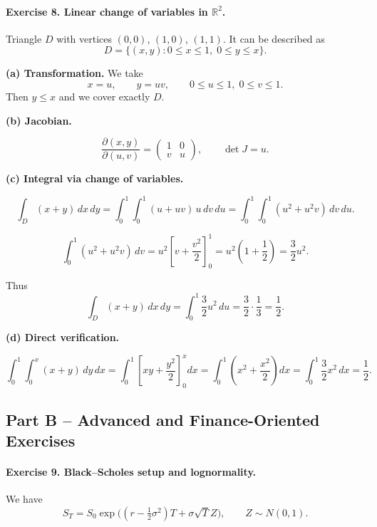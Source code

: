 \documentclass[11pt]{article}
\begin{document}
\bigskip

\paragraph{Exercise 8. Linear change of variables in \(\mathbb{R}^2\).}

Triangle \(D\) with vertices \((0,0)\), \((1,0)\), \((1,1)\).  
It can be described as
\[
D = \{(x,y): 0\le x\le1,\;0\le y\le x\}.
\]

\textbf{(a) Transformation.}  
We take
\[
x=u,\qquad y=uv,\qquad 0\le u\le1,\;0\le v\le1.
\]
Then \(y\le x\) and we cover exactly \(D\).

\textbf{(b) Jacobian.}

\[
\frac{\partial(x,y)}{\partial(u,v)} =
\begin{pmatrix}
1 & 0\\[4pt]
v & u
\end{pmatrix},
\qquad
\det J = u.
\]

\textbf{(c) Integral via change of variables.}

\[
\int_D (x+y)\,dx\,dy
= \int_0^1\int_0^1 (u+uv)\,u\,dv\,du
= \int_0^1\int_0^1 (u^2+u^2v)\,dv\,du.
\]

\[
\int_0^1 (u^2+u^2v)\,dv
= u^2\left[v+\frac{v^2}{2}\right]_0^1
= u^2\left(1+\frac12\right)
= \frac{3}{2}u^2.
\]

Thus
\[
\int_D (x+y)\,dx\,dy
= \int_0^1 \frac{3}{2}u^2\,du
= \frac{3}{2}\cdot\frac{1}{3}
= \frac{1}{2}.
\]

\textbf{(d) Direct verification.}

\[
\int_0^1\int_0^x (x+y)\,dy\,dx
= \int_0^1\left[xy+\frac{y^2}{2}\right]_{0}^{x}dx
= \int_0^1\left(x^2+\frac{x^2}{2}\right)dx
= \int_0^1 \frac{3}{2}x^2\,dx
= \frac{1}{2}.
\]

\bigskip
\bigskip

\subsection*{Part B -- Advanced and Finance-Oriented Exercises}

\bigskip

\paragraph{Exercise 9. Black--Scholes setup and lognormality.}

We have
\[
S_T = S_0\exp\big((r-\tfrac12\sigma^2)T+\sigma\sqrt{T}Z\big),
\qquad Z\sim N(0,1).
\]
\end{document}
